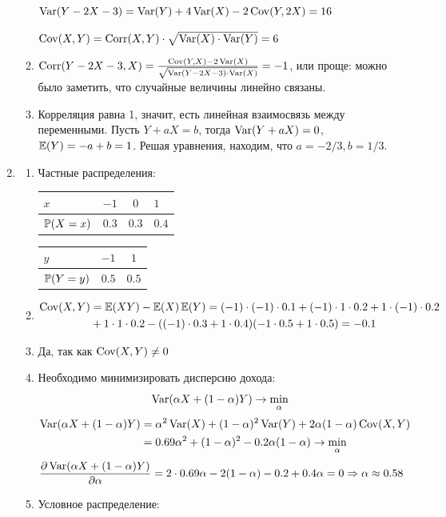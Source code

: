 \begin{enumerate}
\begin{enumerate}
$\Var(Y - 2X - 3) = \Var(Y) + 4\Var(X) - 2\Cov(Y, 2X) = 16$

$\Cov(X, Y) = \Corr(X,Y) \cdot \sqrt{\Var(X) \cdot \Var(Y)} = 6$
\item $\Corr(Y - 2X - 3, X) = \frac{\Cov(Y, X) - 2 \Var(X)}{\sqrt{\Var(Y - 2X - 3) \cdot \Var(X)}} = -1$, или проще: можно было заметить, что случайные величины линейно связаны.
\item Корреляция равна 1, значит, есть линейная взаимосвязь между переменными. Пусть $Y+ a X = b$, тогда $\Var(Y+ a X)=0$, $\E(Y) = -a + b =1 $. Решая уравнения, находим, что $a=-2/3, b=1/3$.
\end{enumerate}
\item
\begin{enumerate}
\item Частные распределения:

\begin{tabular}{@{}lccl@{}}
\toprule
$x$         & $-1$  & $0$   & $1$   \\ \midrule
$\P(X=x)$ & $0.3$ & $0.3$ & $0.4$ \\ \bottomrule
\end{tabular}
\hspace{1cm}
\begin{tabular}{@{}lcc@{}}
\toprule
$y$         & $-1$  & $1$   \\ \midrule
$\P(Y=y)$ & $0.5$ & $0.5$ \\ \bottomrule
\end{tabular}
\item
\begin{align*}
\Cov(X, Y) &= \E(XY) - \E(X)\E(Y) = (-1) \cdot (-1) \cdot 0.1 + (-1) \cdot 1 \cdot 0.2 + 1 \cdot (-1 ) \cdot 0.2 \\
 &+ 1 \cdot 1 \cdot 0.2 - ((-1) \cdot 0.3 + 1 \cdot 0.4) (-1\cdot 0.5 + 1 \cdot 0.5) = -0.1
\end{align*}
\item Да, так как $\Cov(X, Y) \neq 0$
\item Необходимо минимизировать дисперсию дохода:
\[\Var(\alpha X + (1- \alpha)Y) \to \min_{\alpha} \]
\begin{align*}
\Var(\alpha X + (1 - \alpha)Y)  &= \alpha^2 \Var(X) + (1 - \alpha)^2 \Var(Y) + 2 \alpha(1 - \alpha)\Cov(X, Y) \\
&= 0.69 \alpha^2  + (1 - \alpha)^2 -0.2 \alpha(1 - \alpha) \to \min_{\alpha}
\end{align*}
\[
\frac{\partial \Var(\alpha X + (1- \alpha)Y)}{\partial \alpha} = 2 \cdot 0.69 \alpha - 2(1-\alpha) -0.2 + 0.4 \alpha = 0 \Rightarrow
\alpha \approx 0.58
\]
\item Условное распределение:


\end{enumerate}
\end{enumerate}
